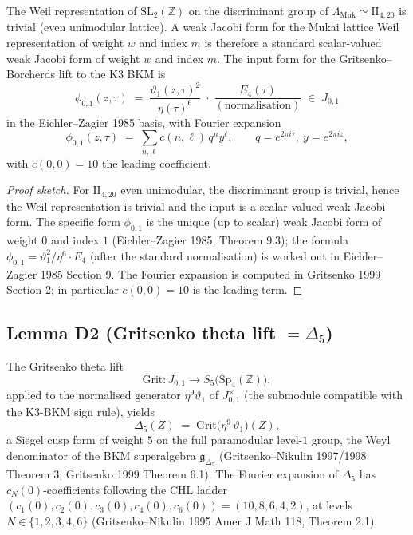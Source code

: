 \begin{lemma}
\label{lem:bl6-mukai-weil-jacobi}
The Weil representation of $\mathrm{SL}_{2}(\mathbb Z)$ on the
discriminant group of $\Lambda_{\mathrm{Muk}} \simeq
\mathrm{II}_{4, 20}$ is trivial (even unimodular lattice).  A weak
Jacobi form for the Mukai lattice Weil representation of weight
$w$ and index $m$ is therefore a standard scalar-valued weak
Jacobi form of weight $w$ and index $m$.  The input form for the
Gritsenko--Borcherds lift to the K3 BKM is
\[
   \phi_{0, 1}(z, \tau)
     \;=\;
   \frac{\vartheta_{1}(z, \tau)^{2}}{\eta(\tau)^{6}}
     \;\cdot\;
   \frac{E_{4}(\tau)}{(\text{normalisation})}
     \;\in\;
   J_{0, 1}
\]
in the Eichler--Zagier 1985 basis, with Fourier expansion
\[
   \phi_{0, 1}(z, \tau)
     \;=\;
   \sum_{n, \ell} c(n, \ell)\, q^{n} y^{\ell},
   \qquad q = e^{2 \pi i \tau},\ y = e^{2 \pi i z},
\]
with $c(0, 0) = 10$ the leading coefficient.
\end{lemma}

\begin{proof}[Proof sketch]
For $\mathrm{II}_{4, 20}$ even unimodular, the discriminant group
is trivial, hence the Weil representation is trivial and the input
is a scalar-valued weak Jacobi form.  The specific form
$\phi_{0, 1}$ is the unique (up to scalar) weak Jacobi form of
weight $0$ and index $1$ (Eichler--Zagier 1985, Theorem 9.3); the
formula $\phi_{0, 1} = \vartheta_{1}^{2}/\eta^{6} \cdot E_{4}$
(after the standard normalisation) is worked out in
Eichler--Zagier 1985 Section 9.  The Fourier expansion is
computed in Gritsenko 1999 Section 2; in particular $c(0, 0) = 10$
is the leading term.
\end{proof}

\subsection*{Lemma D2 (Gritsenko theta lift $= \Delta_5$)}

\begin{lemma}
\label{lem:bl6-gritsenko-lift-delta5}
The Gritsenko theta lift
\[
   \mathrm{Grit}\colon J_{0, 1} \to S_{5}\bigl(\mathrm{Sp}_{4}(\mathbb Z)\bigr),
\]
applied to the normalised generator $\eta^{9} \vartheta_{1}$ of
$J_{0, 1}^{\times}$ (the submodule compatible with the K3-BKM
sign rule), yields
\[
   \Delta_5(Z)
     \;=\;
   \mathrm{Grit}\bigl(\eta^{9}\,\vartheta_{1}\bigr)(Z),
\]
a Siegel cusp form of weight $5$ on the full paramodular level-$1$
group, the Weyl denominator of the BKM superalgebra
$\mathfrak g_{\Delta_{5}}$ (Gritsenko--Nikulin 1997/1998 Theorem 3;
Gritsenko 1999 Theorem 6.1).  The Fourier expansion of $\Delta_5$
has $c_N(0)$-coefficients following the CHL ladder
$(c_1(0), c_2(0), c_3(0), c_4(0), c_6(0)) = (10, 8, 6, 4, 2)$,
at levels $N \in \{1, 2, 3, 4, 6\}$ (Gritsenko--Nikulin 1995
Amer J Math 118, Theorem 2.1).
\end{lemma}

